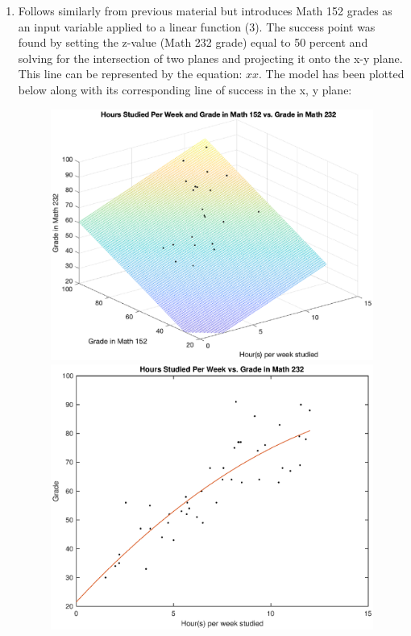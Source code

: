 \documentclass[10pt]{article}
\begin{document}
\begin{enumerate}[leftmargin=\labelsep]
\begin{figure}[h]
\begin{minipage}[c]{0.48\linewidth}
        \end{minipage}%
    \end{figure}

    \item Follows similarly from previous material but introduces Math 152 grades as an input variable applied to a linear function (3). The success point was found by setting the z-value (Math 232 grade) equal to 50 percent and solving for the intersection of two planes and projecting it onto the x-y plane.
    This line can be represented by the equation: $xx$. The model has been plotted below along with its corresponding line of success in the x, y plane:

    \begin{figure}[h]
        \begin{minipage}[c]{0.48\linewidth}
        \includegraphics[width=\linewidth]{Multivariate.eps}
        \end{minipage}
        \hfill
        \begin{minipage}[c]{0.48\linewidth}
        \includegraphics[width=\linewidth]{Quadratic.eps}

\end{minipage}
\end{figure}
\end{enumerate}
\end{document}
